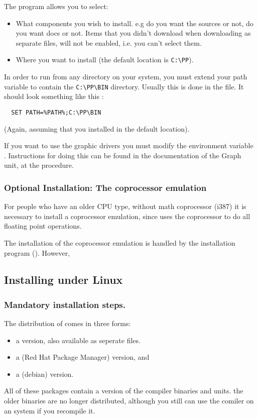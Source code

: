 \documentclass{report}
\begin{document}
The program allows you to select:
\begin{itemize}
\item What components you wish to install. e.g do you want the sources or
not, do you want docs or not. Items that you didn't download when
downloading as separate files, will not be enabled, i.e. you can't 
select them.

\item Where you want to install (the default location is \verb|C:\PP|).
\end{itemize}

In order to run \fpc from any directory on your system, you must extend 
your path variable to contain the \verb|C:\PP\BIN| directory.
Usually this is done in the  file.
It should look something like this : 
\begin{verbatim}
  SET PATH=%PATH%;C:\PP\BIN
\end{verbatim}
(Again, assuming that you installed in the default location).
 
If you want to use the graphic drivers you must modify the
environment variable . Instructions for doing this can be found
in the documentation of the Graph unit, at the  procedure.

\subsubsection{Optional Installation: The coprocessor emulation}
For people who have an older CPU type, without math coprocessor (i387)
it is necessary to install a coprocessor emulation, since \fpc uses the
coprocessor to do all floating point operations.

The installation of the coprocessor emulation is handled by the 
installation program (). However,

%
%
\subsection{Installing under Linux}
\subsubsection{Mandatory installation steps.}
The \linux distribution of \fpc comes in three forms:
\begin{itemize}
\item a  version, also available as seperate files.
\item a  (Red Hat Package Manager) version, and
\item a  (debian) version.
\end{itemize}
All of these packages contain a  version of the compiler binaries and
units. the older  binaries are no longer distributed, although you
still can use the comiler on an  system if you recompile it.
\end{document}
